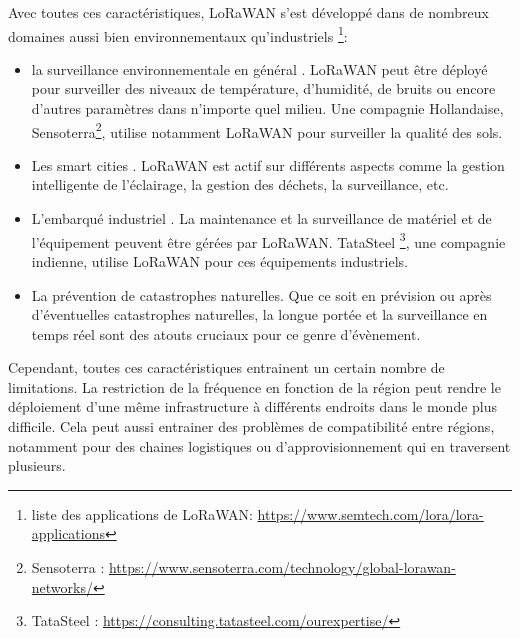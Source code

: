 \vspace{0.1cm}

Avec toutes ces caractéristiques, LoRaWAN s'est développé dans de nombreux domaines aussi bien environnementaux qu'industriels \footnote{liste des applications de LoRaWAN: \href{https://www.semtech.com/lora/lora-applications}{https://www.semtech.com/lora/lora-applications}}:

\vspace{0.1cm}

\begin{itemize}

\item la surveillance environnementale en général \cite{lorauc1}. LoRaWAN peut être déployé pour surveiller des niveaux de température, d'humidité, de bruits ou encore d'autres paramètres dans n'importe quel milieu. Une compagnie Hollandaise, Sensoterra\footnote{Sensoterra : \href{https://www.sensoterra.com/technology/global-lorawan-networks/}{https://www.sensoterra.com/technology/global-lorawan-networks/}}, utilise notamment LoRaWAN pour surveiller la qualité des sols.
\item Les smart cities \cite{lorauc2}. LoRaWAN est actif sur différents aspects comme la gestion intelligente de l'éclairage, la gestion des déchets, la surveillance, etc.
\item L'embarqué industriel \cite{lorauc3}. La maintenance et la surveillance de matériel et de l'équipement peuvent être gérées par LoRaWAN. TataSteel \footnote{TataSteel : \href{https://consulting.tatasteel.com/our_expertise/plant-infrastructure-and-logistics/}{https://consulting.tatasteel.com/ourexpertise/}}, une compagnie indienne, utilise LoRaWAN pour ces équipements industriels.
\item La prévention de catastrophes naturelles. Que ce soit en prévision\cite{lorauc41} ou après\cite{lorauc43} d'éventuelles catastrophes naturelles, la longue portée et la surveillance en temps réel sont des atouts cruciaux pour ce genre d'évènement.
\end{itemize}

\vspace{0.1cm}

Cependant, toutes ces caractéristiques entrainent un certain nombre de limitations. La restriction de la fréquence en fonction de la région peut rendre le déploiement d'une même infrastructure à différents endroits dans le monde plus difficile. Cela peut aussi entrainer des problèmes de compatibilité entre régions, notamment pour des chaines logistiques ou d'approvisionnement qui en traversent plusieurs.

